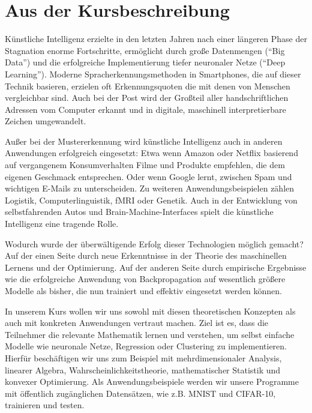 \section{Aus der Kursbeschreibung}
Künstliche Intelligenz erzielte in den letzten Jahren nach einer längeren Phase der Stagnation enorme Fortschritte, ermöglicht durch große Datenmengen (\enquote{Big Data}) und die erfolgreiche Implementierung tiefer neuronaler Netze (\enquote{Deep Learning}). Moderne Spracherkennungsmethoden in Smartphones, die auf dieser Technik basieren, erzielen oft Erkennungsquoten die mit denen von Menschen vergleichbar sind. Auch bei der Post wird der Großteil aller handschriftlichen Adressen vom Computer erkannt und in digitale, maschinell interpretierbare Zeichen umgewandelt.

Außer bei der Mustererkennung wird künstliche Intelligenz auch in anderen Anwendungen erfolgreich eingesetzt: Etwa wenn Amazon oder Netflix basierend auf vergangenem Konsumverhalten Filme und Produkte empfehlen, die dem eigenen Geschmack entsprechen. Oder wenn Google lernt, zwischen Spam und wichtigen E-Mails zu unterscheiden. Zu weiteren Anwendungsbeispielen zählen Logistik, Computerlinguistik, fMRI oder Genetik. 
Auch in der Entwicklung von selbstfahrenden Autos und Brain-Machine-Interfaces spielt die  künstliche Intelligenz eine tragende Rolle.

Wodurch wurde der überwältigende Erfolg dieser Technologien möglich gemacht?
Auf der einen Seite durch neue Erkenntnisse in der Theorie des maschinellen Lernens und der Optimierung. Auf der anderen Seite durch empirische Ergebnisse wie die erfolgreiche Anwendung von Backpropagation auf wesentlich größere Modelle als bisher, die nun trainiert und effektiv eingesetzt werden können.

In unserem Kurs wollen wir uns sowohl mit diesen theoretischen Konzepten als auch mit konkreten Anwendungen vertraut machen. Ziel ist es, dass die Teilnehmer die relevante Mathematik lernen und verstehen, um selbst einfache Modelle wie neuronale Netze, Regression oder Clustering zu implementieren. Hierfür beschäftigen wir uns zum Beispiel mit mehrdimensionaler Analysis, linearer Algebra, Wahrscheinlichkeitstheorie, mathematischer Statistik und konvexer Optimierung. Als Anwendungsbeispiele werden wir unsere Programme mit öffentlich zugänglichen Datensätzen, wie z.B. MNIST und CIFAR-10, trainieren und testen. 
